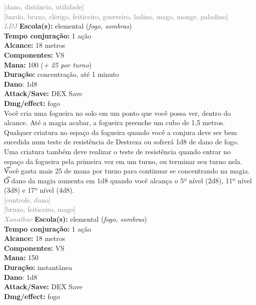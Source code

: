 \documentclass{RPG_Adventure}[2021/10/20]
\begin{document}
{\scriptsize \textcolor{gray}{[dano, distância, utilidade]\\}}
{\scriptsize \textcolor{gray}{[bardo, bruxo, clérigo, feiticeiro, guerreiro, ladino, mago, monge, paladino]\\}}
{\tiny \textcolor{gray}{\textit{LDJ}}}
{\small \t \textbf{Escola(s):} elemental (\textit{fogo, sombras})\\\t \textbf{Tempo conjuração:} 1 ação\\\t \textbf{Alcance:} 18 metros\\\t \textbf{Componentes:} VS\\\t \textbf{Mana:} 100 (\textit{+ 25 por turno})\\\t \textbf{Duração:} concentração, até 1 minuto\\\t \textbf{Dano}: 1d8\\\t \textbf{Attack/Save:} DEX Save\\\t \textbf{Dmg/effect:} fogo\\}
{\normalsize Você cria uma fogueira no solo em um ponto que você possa ver, dentro do alcance. Até a magia acabar, a fogueira preenche um cubo de 1,5 metros. Qualquer criatura no espaço da fogueira quando você a conjura deve ser bem sucedida num teste de resistência de Destreza ou sofrerá 1d8 de dano de fogo. Uma criatura também deve realizar o teste de resistência quando entrar no espaço da fogueira pela primeira vez em um turno, ou terminar seu turno nela.\\\t Você gasta mais 25 de mana por turno para continuar se concentrando na magia.\\\t O dano da magia aumenta em 1d8 quando você alcança o 5º nível (2d8), 11º nível (3d8) e 17º nível (4d8).\\}
{\scriptsize \textcolor{gray}{[controle, dano]\\}}
{\scriptsize \textcolor{gray}{[bruxo, feiticeiro, mago]\\}}
{\tiny \textcolor{gray}{\textit{Xanathar}}}
{\small \t \textbf{Escola(s):} elemental (\textit{fogo, sombras})\\\t \textbf{Tempo conjuração:} 1 ação\\\t \textbf{Alcance:} 18 metros\\\t \textbf{Componentes:} VS\\\t \textbf{Mana:} 150\\\t \textbf{Duração:} instantânea\\\t \textbf{Dano}: 1d8\\\t \textbf{Attack/Save:} DEX Save\\\t \textbf{Dmg/effect:} fogo\\}
\end{document}
